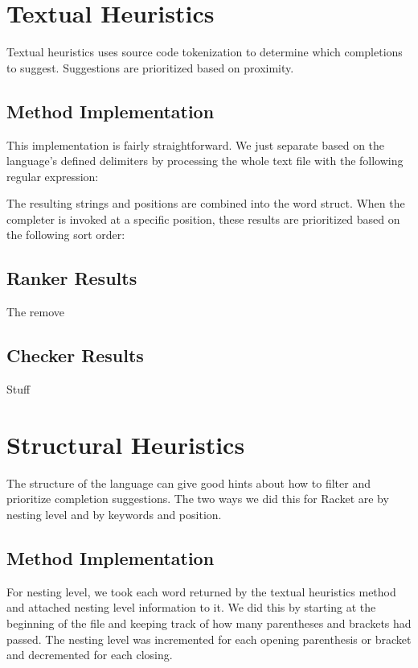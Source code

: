 \documentclass[ms,electronic,twosidetoc,letterpaper,chaptercenter,parttop,lol,lof,lot]{byumsphd}
\begin{document}
\section{Textual Heuristics}

Textual heuristics uses source code tokenization to determine which completions to suggest. Suggestions are prioritized based on proximity.

\subsection{Method Implementation}

This implementation is fairly straightforward. We just separate based on the language's defined delimiters by processing the whole text file with the following regular expression: \scheme{[^\s()[]",'`#|\;]+}

The resulting strings and positions are combined into the word struct. When the completer is invoked at a specific position, these results are prioritized based on the following sort order:


\subsection{Ranker Results}

The remove 

\subsection{Checker Results}

Stuff

\section{Structural Heuristics}

The structure of the language can give good hints about how to filter and prioritize completion suggestions. The two ways we did this for Racket are by nesting level and by keywords and position.

\subsection{Method Implementation}

For nesting level, we took each word returned by the textual heuristics method and attached nesting level information to it. We did this by starting at the beginning of the file and keeping track of how many parentheses and brackets had passed. The nesting level was incremented for each opening parenthesis or bracket and decremented for each closing.
\end{document}
